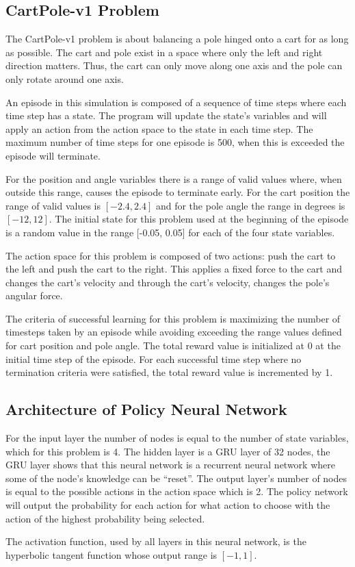 \documentclass{article}
\begin{document}
\subsection*{CartPole-v1 Problem}
The CartPole-v1 problem is about balancing a pole hinged onto a cart for as long as possible. The cart and pole exist in a space where only the left and right direction matters. Thus, the cart can only move along one axis and the pole can only rotate around one axis. \par
\noindent An episode in this simulation is composed of a sequence of time steps where each time step has a state. The program will update the state’s variables and will apply an action from the action space to the state in each time step. The maximum number of time steps for one episode is 500, when this is exceeded the episode will terminate. \par
\noindent For the position and angle variables there is a range of valid values where, when outside this range, causes the episode to terminate early. For the cart position the range of valid values is $[-2.4, 2.4]$ and for the pole angle the range in degrees is $[-12, 12]$. The initial state for this problem used at the beginning of the episode is a random value in the range [-0.05, 0.05] for each of the four state variables. \par
\noindent The action space for this problem is composed of two actions: push the cart to the left and push the cart to the right. This applies a fixed force to the cart and changes the cart’s velocity and through the cart’s velocity, changes the pole’s angular force. \par
\noindent The criteria of successful learning for this problem is maximizing the number of timesteps taken by an episode while avoiding exceeding the range values defined for cart position and pole angle. The total reward value is initialized at 0 at the initial time step of the episode. For each successful time step where no termination criteria were satisfied, the total reward value is incremented by 1. \par
\subsection*{Architecture of Policy Neural Network}
For the input layer the number of nodes is equal to the number of state variables, which for this problem is 4. The hidden layer is a GRU layer of 32 nodes, the GRU layer shows that this neural network is a recurrent neural network where some of the node’s knowledge can be “reset”. The output layer’s number of nodes is equal to the possible actions in the action space which is 2. The policy network will output the probability for each action for what action to choose with the action of the highest probability being selected. \par
\noindent The activation function, used by all layers in this neural network, is the hyperbolic tangent function whose output range is $[-1,1]$. \par
\end{document}

